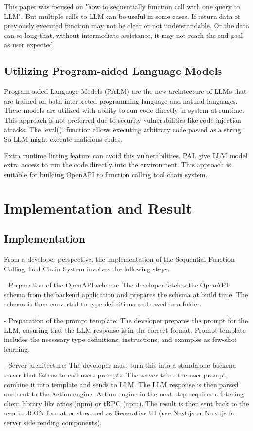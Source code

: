 \documentclass[conference]{IEEEtran}
\begin{document}
This paper was focused on "how to sequentially function call with one query to
LLM". But multiple calls to LLM can be useful in some cases. If return data of
previously executed function may not be clear or not understandable. Or the
data can so long that, without intermediate assistance, it may not reach the
end goal as user expected.

\subsection{Utilizing Program-aided Language Models}
Program-aided Language Models (PALM) are the new architecture of LLMs that are
trained on both interpreted programming language and natural languages. These
models are utilized with ability to run code directly in system at runtime.
This approach is not preferred due to security vulnerabilities like code
injection attacks. The `eval()` function allows executing arbitrary code passed
as a string. So LLM might execute malicious codes.

Extra runtime linting feature can avoid this vulnerabilities. PAL give LLM
model extra access to run the code directly into the environment. This approach
is suitable for building OpenAPI to function calling tool chain system.

\section{Implementation and Result}
\subsection{Implementation}
From a developer perspective, the implementation of the Sequential Function
Calling Tool Chain System involves the following steps:

- Preparation of the OpenAPI schema: The developer fetches the OpenAPI schema from the backend application and prepares the schema at build time. The schema is then converted to type definitions and saved in a folder.

- Preparation of the prompt template: The developer prepares the prompt for the LLM, ensuring that the LLM response is in the correct format. Prompt template includes the necessary type definitions, instructions, and examples as few-shot learning.

- Server architecture: The developer must turn this into a standalone backend server that listens to end users prompts. The server takes the user prompt, combine it into template and sends to LLM. The LLM response is then parsed and sent to the Action engine. Action engine in the next step requires a fetching client library like axios (npm) or tRPC (npm). The result is then sent back to the user in JSON format or streamed as Generative UI (use Next.js or Nuxt.js for server side rending components).
\end{document}
